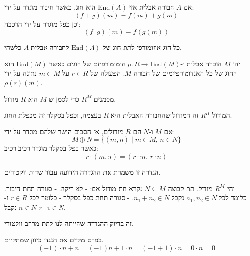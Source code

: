 \documentclass{tstextbook}
\begin{document}
\begin{proposition}
אם \(A\) חבורה אבלית אזי \(\text{End}(A)\) הוא חוג, כאשר חיבור מוגדר על ידי:
$$(f+g)(m)=f(m)+g(m)$$
וכן כפל מוגדר על ידי הרכבה:
$$(f\cdot g)(m)=f(g(m))$$

\end{proposition}
\begin{reminder}
כל חוג איזומורפי לתת חוג של \(\mathrm{End}(A)\) לחבורה אבלית \(A\) כלשהי.

\end{reminder}
\begin{proposition}
יהי \(M\) חוברה אבלית ו-\(\rho:R\to \mathrm{End}(M)\) הומומורפיזם של חוגים כאשר  \(\mathrm{End}(M)\) הוא החוג של כל האנדומורפיזמים של חבורה \(M\).
הפעולה של \(r \in R\) על \(m \in M\) נתונה על ידי \(\rho(r)(m)\).

\end{proposition}
\begin{symbolize}
מסמנים \(R^{M}\) כדי לסמן ש-\(M\) הוא \(R\) מודול.

\end{symbolize}
\begin{example}
המודול \(R^{R}\) זה המודול שהחבורה האבלית היא \(R\) בעצמה, וכפל בסקלר זה מכפלת החוג.

\end{example}
\begin{definition}
אם \(M\) ו-\(N\) הם \(R\) מודולים, אז הסכום הישר שלהם מוגדר על ידי:
$$M\oplus N=\{(m,n)\mid m\in M,\,n\in N\}$$
כאשר כפל בסקלר מוגדר רכיב רכיב:
$$r\cdot(m,n)=(r\cdot m,\,r\cdot n)$$

\end{definition}
\begin{remark}
הגדרה זו משמרת את ההגדרה הידועה עבור שדות ווקטורים.

\end{remark}
\begin{definition}[תת מודול]
יהי \(R^{M}\) מודול. תת קבוצה \(N\subseteq M\) נקרא תת מודול אם:
- לא ריקה.
- סגורה תחת חיבור. כלומר לכל \(n_{1},n_{2} \in N\) נקבל \(n_{1}+n_{2} \in N\).
- סגורה תחת כפל בסקלר - כלומר לכל \(r \in R\) ו-\(n \in N\) נקבל \(r\cdot n \in N\).

\end{definition}
\begin{remark}
זה בדיוק ההגדרה שהייתה לנו לתת מרחב ווקטורי. 

\end{remark}
\begin{remark}
בפרט מקיים את הנגדי כיוון שמתקיים:
$$(-1)\cdot n+n=(-1)n+1\cdot n=(-1+1)\cdot n=0\cdot n=0$$

\end{remark}
\end{document}
